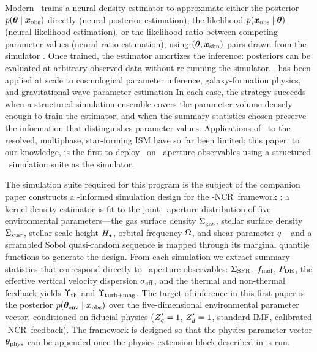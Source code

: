 Modern \SBI\ trains a neural density estimator to approximate either
the posterior $p(\bm{\theta} \mid \bm{x}_{\rm obs})$ directly (neural
posterior estimation), the likelihood $p(\bm{x}_{\rm obs} \mid
\bm{\theta})$ (neural likelihood estimation), or the likelihood ratio
between competing parameter values (neural ratio estimation), using
$(\bm{\theta}, \bm{x}_{\rm sim})$ pairs drawn from the simulator
\citep{2020PNAS..11730055C}. Once trained, the estimator amortizes the
inference: posteriors can be evaluated at arbitrary observed data
without re-running the simulator. \SBI\ has been applied at scale to
cosmological parameter inference, galaxy-formation physics, and
gravitational-wave parameter estimation  In each case, the strategy
succeeds when a structured simulation ensemble covers the parameter
volume densely enough to train the estimator, and when the summary
statistics chosen preserve the information that distinguishes
parameter values. Applications of \SBI\ to the resolved, multiphase,
star-forming ISM have so far been limited; this paper, to our
knowledge, is the first to deploy \SBI\ on \PHANGS\ aperture
observables using a structured \TIGRESS\ simulation suite as the
simulator. 

The simulation suite required for this program is the subject of the
companion paper  
constructs a \PHANGS-informed simulation design for the \TIGRESS-NCR\
framework \citep{2024ApJ...972...67K}: a kernel density estimator is
fit to the joint \PHANGS\ aperture distribution of five environmental
parameters---the gas surface density $\Sigma_{\rm gas}$, stellar surface density
$\Sigma_{\rm star}$, stellar scale height $H_\star$, orbital frequency $\Omega$,
and shear parameter $q$---and a scrambled Sobol quasi-random
sequence is mapped through its marginal quantile functions to generate
the design. From each simulation we extract summary statistics that
correspond directly to \PHANGS\ aperture observables: $\Sigma_{\rm SFR}$, $f_{\rm mol}$,
$P_{\rm DE}$, the effective vertical velocity dispersion $\sigma_{\rm eff}$, and the
thermal and non-thermal feedback yields $\Upsilon_{\rm th}$ and $\Upsilon_{\rm turb+mag}$. The
target of inference in this first paper is the posterior
$p(\boldsymbol{\theta}_{\rm env} \mid \bm{x}_{\rm obs})$ over the five-dimensional
environmental parameter vector, conditioned on fiducial physics
($Z_g' = 1$, $Z_d' = 1$, standard IMF, calibrated \TIGRESS-NCR\
feedback). The framework is designed so that the physics parameter
vector $\boldsymbol{\theta}_{\rm phys}$ can be appended once the physics-extension block
described in \citetalias{CITATION_NEEDED_TBD} is run.

